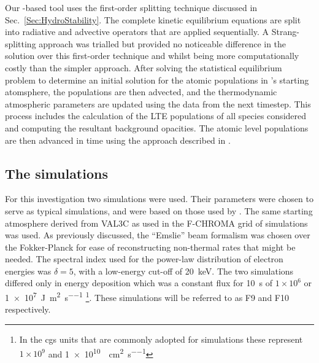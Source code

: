 Our \Lw{}-based tool uses the first-order splitting technique discussed in Sec.~\ref{Sec:HydroStability}.
The complete kinetic equilibrium equations are split into radiative and advective operators that are applied sequentially.
A Strang-splitting approach was trialled but provided no noticeable difference in the solution over this first-order technique and whilst being more computationally costly than the simpler approach.
After solving the statistical equilibrium problem to determine an initial solution for the atomic populations in \Radyn{}'s starting atomsphere, the populations are then advected, and the thermodynamic atmospheric parameters are updated using the \Radyn{} data from the next timestep.
This process includes the calculation of the LTE populations of all species considered and computing the resultant background opacities.
The atomic level populations are then advanced in time using the approach described in \NeedRef{}.

\subsection{The \Radyn{} simulations}

For this investigation two \Radyn{} simulations were used.
Their parameters were chosen to serve as typical simulations, and were based on those used by \citet{Kerr2019, Kerr2019a}.
The same starting atmosphere derived from VAL3C \citep{Vernazza1981} as used in the F-CHROMA grid of simulations was used.
As previously discussed, the ``Emslie'' beam formalism was chosen over the Fokker-Planck for ease of reconstructing non-thermal rates that might be needed.
The spectral index used for the power-law distribution of electron energies was $\delta=5$, with a low-energy cut-off of \SI{20}{\kilo\electronvolt}.
The two simulations differed only in energy deposition which was a constant flux for \SI{10}{\second} of $1\times 10^{6}$ or \SI{1e7}{\joule\per\square\metre\per\second} \footnote{In the cgs units that are commonly adopted for \Radyn{} simulations these represent $1\times 10^9$ and \SI{1e10}{\erg\per\square\centi\metre\per\second}}.
These simulations will be referred to as F9 and F10 respectively.

